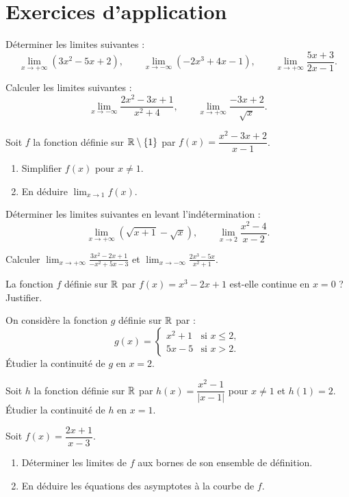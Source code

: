 \section{Exercices d'application}


\exo{}
Déterminer les limites suivantes :
\[
\lim_{x\to +\infty} (3x^2-5x+2),\qquad 
\lim_{x\to -\infty} (-2x^3+4x-1),\qquad 
\lim_{x\to +\infty} \frac{5x+3}{2x-1}.
\]

\exo{}
Calculer les limites suivantes :
\[
\lim_{x\to -\infty} \frac{2x^2-3x+1}{x^2+4},\qquad 
\lim_{x\to +\infty} \frac{-3x+2}{\sqrt{x}}.
\]

\exo{}
Soit $f$ la fonction définie sur $\mathbb{R}\setminus\{1\}$ par $f(x)=\dfrac{x^2-3x+2}{x-1}$.
\begin{enumerate}[label=\alph*)]
\item Simplifier $f(x)$ pour $x\neq 1$.
\item En déduire $\displaystyle\lim_{x\to 1} f(x)$.
\end{enumerate}


\exo{}
Déterminer les limites suivantes en levant l'indétermination :
\[
\lim_{x\to +\infty} (\sqrt{x+1}-\sqrt{x}),\qquad 
\lim_{x\to 2} \frac{x^2-4}{x-2}.
\]

\exo{}
Calculer $\displaystyle\lim_{x\to +\infty} \frac{3x^2-2x+1}{-x^2+5x-3}$ et $\displaystyle\lim_{x\to -\infty} \frac{2x^3-5x}{x^2+1}$.


\exo{}
La fonction $f$ définie sur $\mathbb{R}$ par $f(x)=x^3-2x+1$ est-elle continue en $x=0$ ? Justifier.

\exo{}
On considère la fonction $g$ définie sur $\mathbb{R}$ par :
\[
g(x)=\begin{cases}
x^2+1 &\text{si } x\leq 2,\\
5x-5 &\text{si } x>2.
\end{cases}
\]
Étudier la continuité de $g$ en $x=2$.

\exo{}
Soit $h$ la fonction définie sur $\mathbb{R}$ par $h(x)=\dfrac{x^2-1}{|x-1|}$ pour $x\neq 1$ et $h(1)=2$.
Étudier la continuité de $h$ en $x=1$.


\exo{}
Soit $f(x)=\dfrac{2x+1}{x-3}$.
\begin{enumerate}[label=\alph*)]
\item Déterminer les limites de $f$ aux bornes de son ensemble de définition.
\item En déduire les équations des asymptotes à la courbe de $f$.
\end{enumerate}


